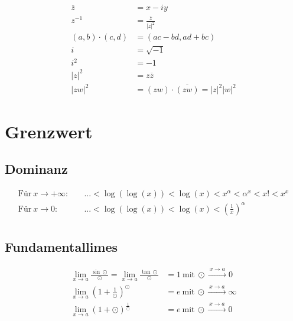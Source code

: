 \documentclass[11pt]{article}
\begin{document}
\begin{equation*}
\begin{split}
	\overline{z} & = x - iy\\
	z^{-1} & = \frac{\overline{z}}{|z|^2} \\
	(a,b) \cdot (c, d) & = (ac-bd, ad+bc) \\
	i & = \sqrt{-1}\\
	i^2 & = -1 \\
	|z|^2 & = z\overline{z} \\
	|zw|^2 & = (zw) \cdot \overline{(zw)} = |z|^2|w|^2
\end{split}
\end{equation*}

\section{Grenzwert}

\subsection{Dominanz}

\begin{equation*}
\begin{split}
	\text{F{\"u}r}\ x \to +\infty:\quad & ... < \log(\log(x)) < \log(x) < x^\alpha < \alpha^x < x! < x^x \\
	\text{F{\"u}r}\ x \to 0:\quad & ... < \log(\log(x)) < \log(x) < (\frac{1}{x})^\alpha \\
\end{split}
\end{equation*}

\subsection{Fundamentallimes}

\begin{equation*}
\begin{split}
	\lim_{x \to a} \frac{\sin \odot}{\odot} = \lim_{x \to a} \frac{\tan \odot}{\odot} & = 1\ \text{mit}\ \odot \xrightarrow{\: x \to a \: } 0 \\ 
	\lim_{x \to a} (1 + \frac{1}{\odot})^\odot & = e\ \text{mit}\ \odot \xrightarrow{\: x \to a \: } \infty \\ 
	\lim_{x \to a} (1 + \odot)^\frac{1}{\odot} & = e\ \text{mit}\ \odot \xrightarrow{\: x \to a \: } 0 \\ 
\end{split}
\end{equation*}
\end{document}
